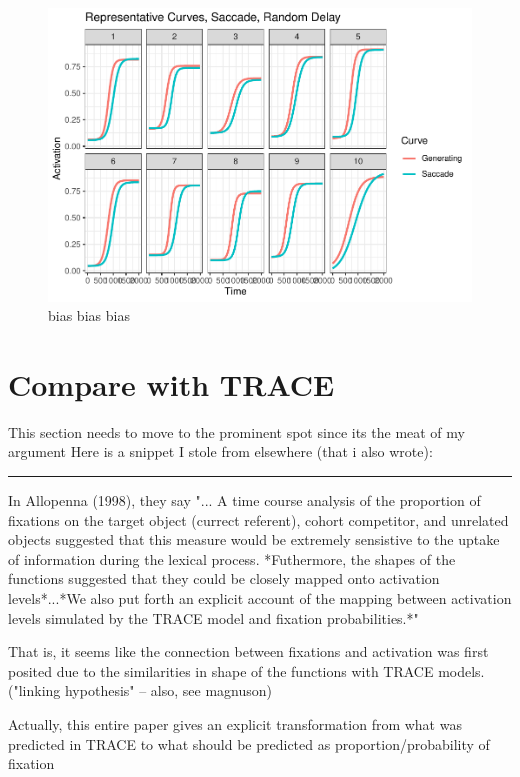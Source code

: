 \documentclass{article}
\begin{document}
\begin{figure}[h]
\centering
\includegraphics{saccade_random_pb_curves.pdf}
\caption{bias bias bias}
\label{fig:something_else}
\end{figure}


\section{Compare with TRACE}

This section needs to move to the prominent spot since its the meat of my argument 
Here is a snippet I stole from elsewhere (that i also wrote):

\noindent\rule{2cm}{0.4pt}

In Allopenna (1998), they say "... A time course analysis of the proportion of fixations on the target object (currect referent), cohort competitor, and unrelated objects suggested that this measure would be extremely sensistive to the uptake of information during the lexical process. *Futhermore, the shapes of the functions suggested that they could be closely mapped onto activation levels*...*We also put forth an explicit account of the mapping between activation levels simulated by the TRACE model and fixation probabilities.*"

That is, it seems like the connection between fixations and activation was first posited due to the similarities in shape of the functions with TRACE models. ("linking hypothesis" -- also, see magnuson)

Actually, this entire paper gives an explicit transformation from what was predicted in TRACE to what should be predicted as proportion/probability of fixation
\end{document}

